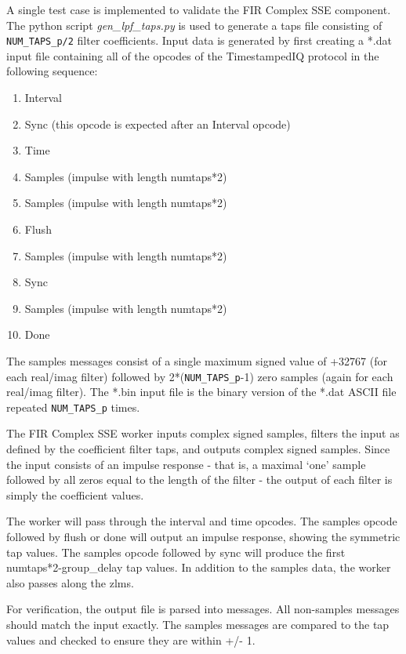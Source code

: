 \begin{flushleft}
A single test case is implemented to validate the FIR Complex SSE component. The python script \textit{gen\_lpf\_taps.py} is used to generate a taps file consisting of \verb+NUM_TAPS_p/2+ filter coefficients. Input data is generated by first creating a *.dat input file containing all of the opcodes of the TimestampedIQ protocol in the following sequence:
\begin{enumerate}
	\item Interval
	\item Sync (this opcode is expected after an Interval opcode)
	\item Time
	\item Samples (impulse with length numtaps*2)
	\item Samples (impulse with length numtaps*2)
	\item Flush	
	\item Samples (impulse with length numtaps*2)
	\item Sync
	\item Samples (impulse with length numtaps*2)
	\item Done
\end{enumerate}

The samples messages consist of a single maximum signed value of +32767 (for each real/imag filter) followed by 2*(\verb+NUM_TAPS_p+-1) zero samples (again for each real/imag filter). The *.bin input file is the binary version of the *.dat ASCII file repeated \verb+NUM_TAPS_p+ times.\medskip

The FIR Complex SSE worker inputs complex signed samples, filters the input as defined by the coefficient filter taps, and outputs complex signed samples. Since the input consists of an impulse response - that is, a maximal `one' sample followed by all zeros equal to the length of the filter - the output of each filter is simply the coefficient values.\medskip

The worker will pass through the interval and time opcodes. The samples opcode followed by flush or done will output an impulse response, showing the symmetric tap values. The samples opcode followed by sync will produce the first numtaps*2-group\_delay tap values. In addition to the samples data, the worker also passes along the zlms.\medskip

For verification, the output file is parsed into messages. All non-samples messages should match the input exactly. The samples messages are compared to the tap values and checked to ensure they are within +/- 1. 
\end{flushleft}

